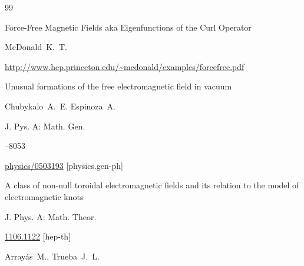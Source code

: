 \begin{thebibliography}{99}

\eprint  Force-Free Magnetic Fields aka Eigenfunctions of the Curl Operator

\by McDonald~K.~T.


\elink \url{http://www.hep.princeton.edu/~mcdonald/examples/forcefree.pdf}





\paper Unusual formations of the free electromagnetic field in vacuum

\by Chubykalo~A.~E. Espinoza~A. 

\jour J. Pys. A: Math. Gen. 



--8053 



\arxiv \href{http://arxiv.org/abs/physics/0503193}{physics/0503193} [physics.gen-ph]




\paper A class of non-null toroidal electromagnetic fields and its relation to the model of electromagnetic knots


\jour J. Phys. A: Math. Theor. 





\arxiv \href{http://arxiv.org/abs/1106.1122}{1106.1122} [hep-th]

\by Array\'as~M., Trueba~J.~L.



\end{thebibliography}



\EngDate



\newpage

\Russian





%

